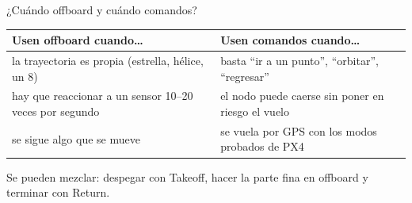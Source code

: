 \begin{frame}{¿Cuándo offboard y cuándo comandos?}
  \centering\small
  \begin{tabular}{p{5.4cm}p{6.2cm}}
    \toprule
    Usen \textbf{offboard} cuando\ldots & Usen \textbf{comandos} cuando\ldots \\
    \midrule
    la trayectoria es propia (estrella, hélice, un 8) & basta ``ir a un punto'', ``orbitar'', ``regresar'' \\
    hay que reaccionar a un sensor 10--20 veces por segundo & el nodo puede caerse sin poner en riesgo el vuelo \\
    se sigue algo que se mueve & se vuela por GPS con los modos probados de PX4 \\
    \bottomrule
  \end{tabular}
  \vspace{0.6em}
  \begin{idea}
    \small Se pueden mezclar: despegar con Takeoff, hacer la parte fina en offboard y terminar con Return.
  \end{idea}
\end{frame}
